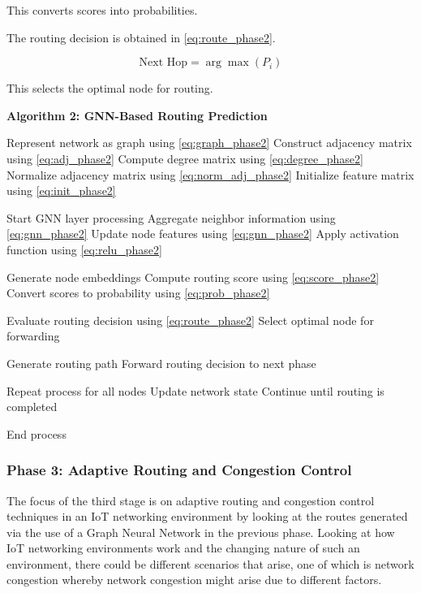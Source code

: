 \documentclass[a4paper,fleqn]{cas-dc}
\numberwithin{equation}{section}
\begin{document}
This converts scores into probabilities.

The routing decision is obtained in \ref{eq:route_phase2}.

\begin{equation}
\text{Next Hop} = \arg\max(P_i)
\label{eq:route_phase2}
\end{equation}

This selects the optimal node for routing.

\bigskip

\textbf{Algorithm 2: GNN-Based Routing Prediction}

\begin{algorithm}[H]
\caption{GNN Based Routing and Decision Process}
\label{alg:gnn_routing}
\begin{algorithmic}

\STATE Represent network as graph using \ref{eq:graph_phase2}
\STATE Construct adjacency matrix using \ref{eq:adj_phase2}
\STATE Compute degree matrix using \ref{eq:degree_phase2}
\STATE Normalize adjacency matrix using \ref{eq:norm_adj_phase2}
\STATE Initialize feature matrix using \ref{eq:init_phase2}

\STATE Start GNN layer processing
\STATE Aggregate neighbor information using \ref{eq:gnn_phase2}
\STATE Update node features using \ref{eq:gnn_phase2}
\STATE Apply activation function using \ref{eq:relu_phase2}

\STATE Generate node embeddings
\STATE Compute routing score using \ref{eq:score_phase2}
\STATE Convert scores to probability using \ref{eq:prob_phase2}

\STATE Evaluate routing decision using \ref{eq:route_phase2}
\STATE Select optimal node for forwarding

\STATE Generate routing path
\STATE Forward routing decision to next phase

\STATE Repeat process for all nodes
\STATE Update network state
\STATE Continue until routing is completed

\STATE End process

\end{algorithmic}
\end{algorithm}
\subsubsection{Phase 3: Adaptive Routing and Congestion Control}
The focus of the third stage is on adaptive routing and congestion control techniques in an IoT networking environment by looking at the routes generated via the use of a Graph Neural Network in the previous phase. Looking at how IoT networking environments work and the changing nature of such an environment, there could be different scenarios that arise, one of which is network congestion whereby network congestion might arise due to different factors.
\end{document}
